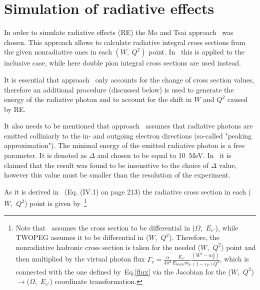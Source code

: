 \chapter{Simulation of radiative effects}
\label{rad_eff}


In order to simulate radiative effects (RE) the Mo and Tsai approach~\cite{Mo:1968cg} was chosen. This approach allows to calculate radiative integral cross sections from the given nonradiative ones in each $(W,~Q^{2})$ point. In~\cite{Mo:1968cg} this is applied to the inclusive case, while here double pion integral cross sections are used instead. 

It is essential that approach~\cite{Mo:1968cg} only accounts for the change of cross section values, therefore an additional procedure (discussed below) is used to generate the energy of the radiative photon and to account for the shift in $W$ and $Q^2$ caused by RE.

It also needs to be mentioned that approach~\cite{Mo:1968cg} assumes that radiative photons are emitted colliniarly to the in- and outgoing electron directions (so-called "peaking approximation"). The minimal energy of the emitted radiative photon is a free parameter. It is denoted as $\Delta$ and chosen to be equal to 10~MeV. In~\cite{Mo:1968cg} it is claimed that the result was found to be insensitive to the choice of $\Delta$ value, however this value must be smaller than the resolution of the experiment.  


As it is derived in~\cite{Mo:1968cg} (Eq. (IV.1) on page 213) the radiative cross section in each ($W$,~$Q^2$) point is given by~\footnote[1]{Note that~\cite{Mo:1968cg} assumes the cross section to be differential in ($\Omega$,~$E_{e'}$), while TWOPEG assumes it to be differential in ($W$,~$Q^2$). Therefore, the nonradiative hadronic cross section is taken for the needed ($W$,~$Q^2$) point and then multiplied by the virtual photon flux $\Gamma_{v} = \frac{\alpha}{4\pi^2}\frac{E_{e'}}{E_{beam}m_{p}}\frac{(W^{2}-m_{p}^{2})}{(1-\varepsilon_{T})Q^{2}}$, which is connected with the one defined by~Eq.\eqref{flux} via the Jacobian for the ($W$,~$Q^2$)$\rightarrow$($\Omega$,~$E_{e'}$) coordinate transformation.}

